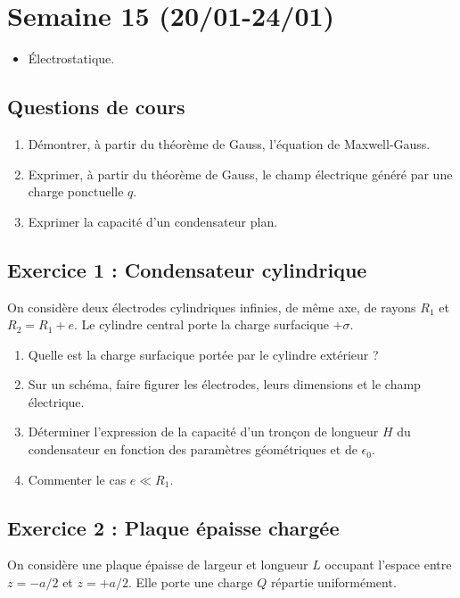 \section{Semaine 15 (20/01-24/01)}


\begin{itemize}
	\item Électrostatique.
\end{itemize}

\subsection{Questions de cours}
\begin{enumerate}
	\item Démontrer, à partir du théorème de Gauss, l'équation de Maxwell-Gauss.
	\item Exprimer, à partir du théorème de Gauss, le champ électrique généré par une charge ponctuelle $q$.
	\item Exprimer la capacité d'un condensateur plan.
\end{enumerate}

\subsection{Exercice 1 : Condensateur cylindrique}

On considère deux électrodes cylindriques infinies, de même axe, de rayons $R_1$ et $R_2 = R_1 + e$. Le cylindre central porte la charge surfacique $+\sigma$.

\begin{enumerate}
	\item Quelle est la charge surfacique portée par le cylindre extérieur ?
	\item Sur un schéma, faire figurer les électrodes, leurs dimensions et le champ électrique.
	\item Déterminer l'expression de la capacité d'un tronçon de longueur $H$ du condensateur en fonction des paramètres géométriques et de $\epsilon_0$.
	\item Commenter le cas $e \ll R_1$.
\end{enumerate}

\subsection{Exercice 2 : Plaque épaisse chargée}

On considère une plaque épaisse de largeur et longueur $L$ occupant l'espace entre $z=-a/2$ et $z=+a/2$. Elle porte une charge $Q$ répartie uniformément.

